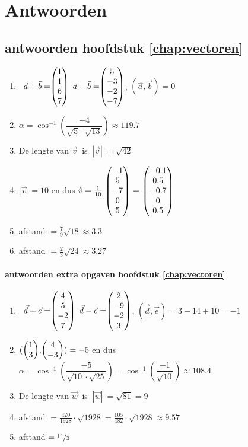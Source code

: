 \chapter{Antwoorden}

\section{antwoorden  hoofdstuk \ref{chap:vectoren}}
\begin{enumerate}
	\item   \ $ \vec{a} + \vec{b}  = \vecvier{1}{1}{6}{7} $   \qquad $ \vec{a} - \vec{b} = \vecvier{5}{-3}{-2}{-7} $,   \qquad $  (\vec{a} , \vec{b}) = 0 $ 
	
	
	\item  $\alpha = \cos ^{-1} (\dfrac{-4}{\sqrt{5}\cdot\sqrt{13}}) \approx 119.7 $ 
	
	\item De lengte van  $  \vec{v} \ $ is $ \ |\vec{v}| \  =  \sqrt{42}$
	
	\item $|\vec{v}| = 10$ en dus $ \hat{v} = \frac{1}{10}\  \vecvijf{-1}{5}{-7}{0}{5} \  = \  \vecvijf{-0.1}{0.5}{-0.7}{0}{0.5} $
	
	\item afstand  $ = \frac{7}{9}\sqrt{18} \approx 3.3 $

    \item afstand  $ = \frac{2}{3}\sqrt{24} \approx 3.27 $
\end{enumerate}

\subsubsection{antwoorden extra opgaven hoofdstuk \ref{chap:vectoren}}
\begin{enumerate}
	
	\item  \ $ \vec{d} + \vec{e}  = \vecvier{4}{5}{-2}{7} $   \qquad $ \vec{d} - \vec{e} = \vecvier{2}{-9}{-2}{3} $,   \qquad $  (\vec{d} , \vec{e}) = 3-14+10 = -1 $ 
	
	\item $  (\vectwee{1}{3} , \vectwee{4}{-3}) = -5 $  en dus $\alpha = \cos ^{-1} (\dfrac{-5}{\sqrt{10}\cdot\sqrt{25}})= \cos ^{-1} (\dfrac{-1}{\sqrt{10}}) \approx 108.4 $ 
	
	\item De lengte van  $  \vec{w} \ $ is $ \ |\vec{w}| \  =  \sqrt{81} = 9 $
	
	\item afstand  $ = \frac{420}{1928}\cdot\sqrt{1928} = \frac{105}{482}\cdot\sqrt{1928} \approx 9.57 $
	
	\item    afstand  $ = \nicefrac{11}{3} $
\end{enumerate}	

